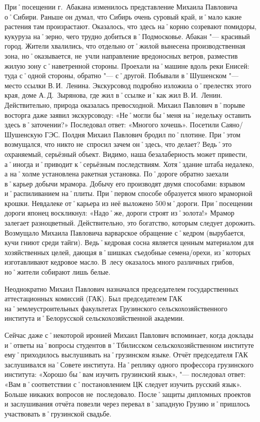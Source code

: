 При˚посещении г.~Абакана изменилось представление Михаила Павловича о˚Сибири. Раньше он думал, что Сибирь очень суровый край, и˚мало какие растения там произрастают. Оказалось, что здесь на˚корню созревают помидоры, кукуруза на˚зерно, чего трудно добиться в˚Подмосковье. Абакан "--- красивый город. Жители хвалились, что отдельно от˚жилой вынесена производственная зона, но˚оказывается, не~учли направление вредоносных ветров, разместив жилую зону с˚наветренной стороны. Проехали на˚машине вдоль реки Енисей: туда с˚одной стороны, обратно "--- с˚другой. Побывали в˚Шушенском "--- место ссылки В.\,И.~Ленина. Экскурсовод подробно изложила о˚прелестях этого края, доме А.\,Д.~Зырянова, где жил в˚ссылке и˚как жил В.\,И.~Ленин. Действительно, природа оказалась превосходной. Михаил Павлович в˚порыве восторга даже заявил экскурсоводу: «Не˚могли бы˚меня на˚недельку оставить здесь в˚заточении?» Последовал ответ: «Многого хочешь». Посетили Саяно\-/Шушенскую ГЭС. Полдня Михаил Павлович бродил по˚плотине. При˚этом возмущался, что никто не~спросил зачем он˚здесь, что делает? Ведь˚это охраняемый, серьёзный объект. Видимо, наша безалаберность может привести, а˚иногда и˚приводит к˚серьёзным последствиям. Хотя˚здание штаба недалеко, а на˚холме установлена ракетная установка. По˚дороге обратно заехали в˚карьер добычи мрамора. Добычу его производят двумя способами: взрывом и˚распиливанием на˚плиты. При˚первом способе образуется много мраморной крошки. Невдалеке от˚карьера из неё выложено 500\,м˚дороги. При˚посещении дороги японец воскликнул: «Надо˚же, дороги строят из˚золота!» Мрамор залегает разноцветный. Действительно, это богатство, которым следует дорожить. Возмущало Михаила Павловича варварское обращение с˚кедром (вырубается, кучи гниют среди тайги). Ведь˚кедровая сосна является ценным материалом для хозяйственных целей, дающая в˚шишках съедобные семена\-/орехи, из˚которых изготавливают кедровое масло. В~лесу оказалось много различных грибов, но˚жители собирают лишь белые.

Неоднократно Михаил Павлович назначался председателем государственных аттестационных комиссий (ГАК). Был председателем ГАК на˚землеустроительных факультетах Грузинского сельскохозяйственного института и˚Белорусской сельскохозяйственной академии. 

Сейчас даже с˚некоторой иронией Михаил Павлович вспоминает, когда доклады и˚ответы на˚вопросы студентов в˚Тбилисском сельскохозяйственном институте ему˚приходилось выслушивать на˚грузинском языке. Отчёт председателя ГАК заслушивался на˚Совете института. На˚реплику одного профессора грузинского института: «Хорошо бы˚вам изучить грузинский язык», "--- последовал ответ: «Вам в˚соответствии с˚постановлением ЦК следует изучить русский язык». Больше никаких вопросов не~последовало. После˚защиты дипломных проектов и заслушивания отчёта повезли через перевал в˚западную Грузию и˚пришлось участвовать в˚грузинской свадьбе.

